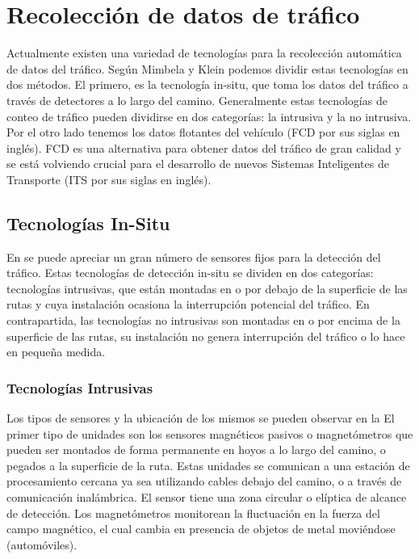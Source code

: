 \chapter{Recolección de datos de tráfico}

Actualmente existen una variedad de tecnologías para la recolección automática de datos del tráfico. Según Mimbela y Klein \cite{mimbela2003summary} podemos dividir estas tecnologías en dos métodos. El primero, es la tecnología in-situ, que toma los datos del tráfico a través de detectores a lo largo del camino. Generalmente estas tecnologías de conteo de tráfico pueden dividirse en dos categorías: la intrusiva y la no intrusiva. Por el otro lado tenemos los datos flotantes del vehículo (FCD por sus siglas en inglés). FCD es una alternativa para obtener datos del tráfico de gran calidad y se está volviendo crucial para el desarrollo de nuevos Sistemas Inteligentes de Transporte (ITS por sus siglas en inglés).

\section{Tecnologías In-Situ}

En \cite{klein2006traffic} se puede apreciar un gran número de sensores fijos para la detección del tráfico. Estas tecnologías de detección in-situ se dividen en dos categorías: tecnologías intrusivas, que están montadas en o por debajo de la superficie de las rutas y cuya instalación ocasiona la interrupción potencial del tráfico. En contrapartida, las tecnologías no intrusivas son montadas en o por encima de la superficie de las rutas, su instalación no genera interrupción del tráfico o lo hace en pequeña medida. 

\subsection{Tecnologías Intrusivas}

Los tipos de sensores y la ubicación de los mismos se pueden observar en la  El primer tipo de unidades son los sensores magnéticos pasivos o magnetómetros que pueden ser montados de forma permanente en hoyos a lo largo del camino, o pegados a la superficie de la ruta. Estas unidades se comunican a una estación de procesamiento cercana ya sea utilizando cables debajo del camino, o a través de comunicación inalámbrica. El sensor tiene una zona circular o elíptica de alcance de detección. Los magnetómetros monitorean la fluctuación en la fuerza del campo magnético, el cual cambia en presencia de objetos de metal moviéndose (automóviles).

